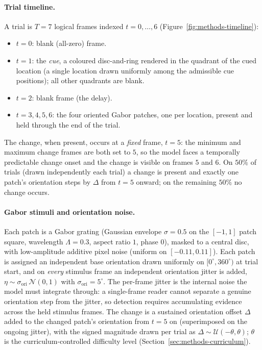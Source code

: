 \paragraph{Trial timeline.}
A trial is $T = 7$ logical frames indexed $t = 0, \dots, 6$
(Figure~\ref{fig:methods-timeline}):
\begin{itemize}
\item $t = 0$: blank (all-zero) frame.
\item $t = 1$: the \emph{cue}, a coloured disc-and-ring rendered in the
  quadrant of the cued location (a single location drawn uniformly among
  the admissible cue positions); all other quadrants are blank.
\item $t = 2$: blank frame (the delay).
\item $t = 3,4,5,6$: the four oriented Gabor patches, one per location,
  present and held through the end of the trial.
\end{itemize}
The change, when present, occurs at a \emph{fixed} frame, $t = 5$: the
minimum and maximum change frames are both set to $5$, so the model faces
a temporally predictable change onset and the change is visible on frames
$5$ and $6$. On $50\%$ of trials (drawn independently each trial) a change
is present and exactly one patch's orientation steps by $\Delta$ from
$t = 5$ onward; on the remaining $50\%$ no change occurs.

\paragraph{Gabor stimuli and orientation noise.}
Each patch is a Gabor grating (Gaussian envelope $\sigma = 0.5$ on the
$[-1,1]$ patch square, wavelength $\Lambda = 0.3$, aspect ratio $1$, phase
$0$), masked to a central disc, with low-amplitude additive pixel noise
(uniform on $[-0.11, 0.11]$). Each patch is assigned an independent base
orientation drawn uniformly on $[0^\circ, 360^\circ)$ at trial start, and
on \emph{every} stimulus frame an independent orientation jitter is added,
$\eta \sim \sigma_{\mathrm{ori}}\,\mathcal{N}(0,1)$ with
$\sigma_{\mathrm{ori}} = 5^\circ$. The per-frame jitter is the internal
noise the model must integrate through: a single-frame reader cannot
separate a genuine orientation step from the jitter, so detection requires
accumulating evidence across the held stimulus frames. The change is a
sustained orientation offset $\Delta$ added to the changed patch's
orientation from $t = 5$ on (superimposed on the ongoing jitter), with the
signed magnitude drawn per trial as $\Delta \sim \mathcal{U}(-\theta,
\theta)$; $\theta$ is the curriculum-controlled difficulty level
(Section~\ref{sec:methods-curriculum}).

